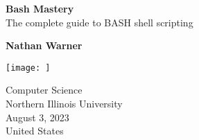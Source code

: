 \documentclass{report}
\title{\Huge{}}
\author{\huge{Nathan Warner}}
\date{\huge{}}
\begin{document}
        \begin{titlepage}
       \begin{center}
           \vspace*{1cm}
    
           \textbf{Bash Mastery} \\
           The complete guide to BASH shell scripting
    
           \vspace{0.5cm}
            
                
           \vspace{1.5cm}
    
           \textbf{Nathan Warner}
    
           \vfill
                
                
           \vspace{0.8cm}
         
           \texttt{[image: ]}
                
           Computer Science \\
           Northern Illinois University\\
           August 3, 2023 \\
           United States\\
           
                
       \end{center}
    \end{titlepage}
    \tableofcontents
    \pagebreak \bigbreak \noindent
\end{document}
